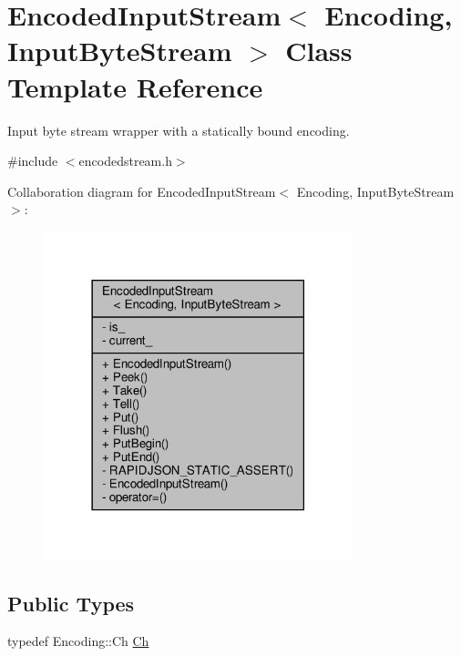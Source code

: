 \hypertarget{classEncodedInputStream}{}\section{Encoded\+Input\+Stream$<$ Encoding, Input\+Byte\+Stream $>$ Class Template Reference}
\label{classEncodedInputStream}


Input byte stream wrapper with a statically bound encoding.  




{\ttfamily \#include $<$encodedstream.\+h$>$}



Collaboration diagram for Encoded\+Input\+Stream$<$ Encoding, Input\+Byte\+Stream $>$\+:
\nopagebreak
\begin{figure}[H]
\begin{center}
\leavevmode
\includegraphics[width=254pt]{classEncodedInputStream__coll__graph}
\end{center}
\end{figure}
\subsection*{Public Types}
\begin{DoxyCompactItemize}
\item 
typedef Encoding\+::\+Ch \hyperlink{classEncodedInputStream_acc387a1364390da244bbb1ab07bdceca}{Ch}
\end{DoxyCompactItemize}
